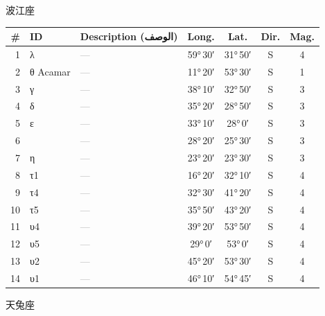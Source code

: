 \documentclass[9pt,a4paper]{extarticle}
\newcommand{\ar}[1]{{\arabicfont\textarabic{#1}}}
\begin{document}
\vspace{4pt}\quad\ar{النهر}\quad 波江座
\begin{longtable}{r l >{\raggedright\arraybackslash}p{6.7cm} c c c c}
\toprule \# & ID & Description (\ar{الوصف}) & Long. & Lat. & Dir. & Mag.\\ \midrule\endhead
1 & λ & \textcolor{gray}{—} & 59°\,30′ & 31°\,50′ & S & 4\\
2 & θ Acamar & \textcolor{gray}{—} & 11°\,20′ & 53°\,30′ & S & 1\\
3 & γ & \textcolor{gray}{—} & 38°\,10′ & 32°\,50′ & S & 3\\
4 & δ & \textcolor{gray}{—} & 35°\,20′ & 28°\,50′ & S & 3\\
5 & ε & \textcolor{gray}{—} & 33°\,10′ & 28°\,0′ & S & 3\\
6 &  & \textcolor{gray}{—} & 28°\,20′ & 25°\,30′ & S & 3\\
7 & η & \textcolor{gray}{—} & 23°\,20′ & 23°\,30′ & S & 3\\
8 & τ1 & \textcolor{gray}{—} & 16°\,20′ & 32°\,10′ & S & 4\\
9 & τ4 & \textcolor{gray}{—} & 32°\,30′ & 41°\,20′ & S & 4\\
10 & τ5 & \textcolor{gray}{—} & 35°\,50′ & 43°\,20′ & S & 4\\
11 & υ4 & \textcolor{gray}{—} & 39°\,20′ & 53°\,50′ & S & 4\\
12 & υ5 & \textcolor{gray}{—} & 29°\,0′ & 53°\,0′ & S & 4\\
13 & υ2 & \textcolor{gray}{—} & 45°\,20′ & 53°\,30′ & S & 4\\
14 & υ1 & \textcolor{gray}{—} & 46°\,10′ & 54°\,45′ & S & 4\\
\bottomrule\end{longtable}
\vspace{4pt}\quad\ar{الأرنب}\quad 天兔座
\end{document}
